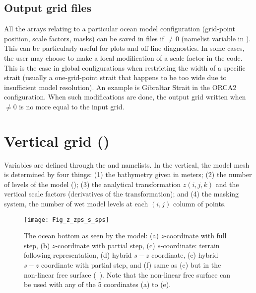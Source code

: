 \documentclass[../main/NEMO_manual]{subfiles}
\begin{document}
\subsection{Output grid files}
\label{subsec:DOM_hgr_files}

All the arrays relating to a particular ocean model configuration (grid-point position, scale factors, masks)
can be saved in files if  $\not = 0$ (namelist variable in ).
This can be particularly useful for plots and off-line diagnostics.
In some cases, the user may choose to make a local modification of a scale factor in the code.
This is the case in global configurations when restricting the width of a specific strait
(usually a one-grid-point strait that happens to be too wide due to insufficient model resolution).
An example is Gibraltar Strait in the ORCA2 configuration.
When such modifications are done,
the output grid written when  $\not = 0$ is no more equal to the input grid.

\section{Vertical grid (\protect{})}
\label{sec:DOM_zgr}
%


Variables are defined through the  and  namelists.
In the vertical, the model mesh is determined by four things: 
(1) the bathymetry given in meters; 
(2) the number of levels of the model (); 
(3) the analytical transformation $z(i,j,k)$ and the vertical scale factors (derivatives of the transformation); and
(4) the masking system, \ie the number of wet model levels at each 
$(i,j)$ column of points.

\begin{figure}[!tb]
  \begin{center}
    \texttt{[image: Fig\_z\_zps\_s\_sps]}
    \caption{
      \protect\label{fig:z_zps_s_sps}
      The ocean bottom as seen by the model:
      (a) $z$-coordinate with full step,
      (b) $z$-coordinate with partial step,
      (c) $s$-coordinate: terrain following representation,
      (d) hybrid $s-z$ coordinate,
      (e) hybrid $s-z$ coordinate with partial step, and
      (f) same as (e) but in the non-linear free surface (\protect{}~).
      Note that the non-linear free surface can be used with any of the 5 coordinates (a) to (e).
    }
  \end{center}
\end{figure}
\end{document}
